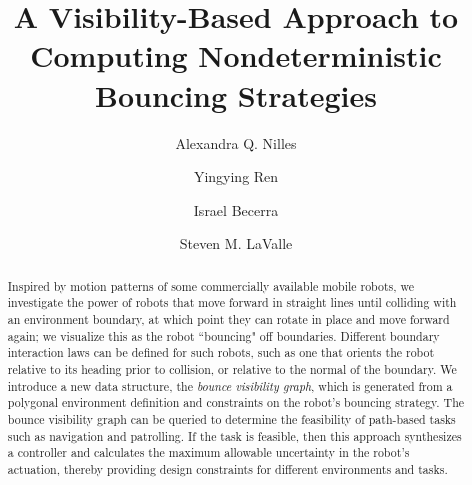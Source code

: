 \documentclass[]{styles/svproc}  %
\begin{document}
\mainmatter              %


\title{A Visibility-Based Approach to Computing Nondeterministic Bouncing
Strategies}

\author{Alexandra Q. Nilles \and Yingying Ren \and Israel
Becerra \and Steven M. LaValle%
}


\maketitle

\begin{abstract}
Inspired by motion patterns of some commercially available mobile robots, we investigate the power of robots that 
move forward in straight lines
until colliding with an environment boundary, at which point they can rotate in
place and move forward again; we visualize this as the robot ``bouncing" off
boundaries. Different boundary interaction laws can be
defined for such robots, such as one that orients the robot relative to its
heading prior to collision, or relative to the normal of the boundary. We introduce a new data structure, the {\em bounce visibility graph}, which is generated 
from a polygonal environment definition and constraints on the robot's bouncing 
strategy. The bounce visibility graph can be queried to determine the feasibility 
of path-based tasks such as navigation and patrolling. If the task is feasible, then this
approach synthesizes a controller and calculates the maximum allowable 
uncertainty in the robot's actuation, thereby providing design constraints for different 
environments and tasks.
\end{abstract}
\end{document}
